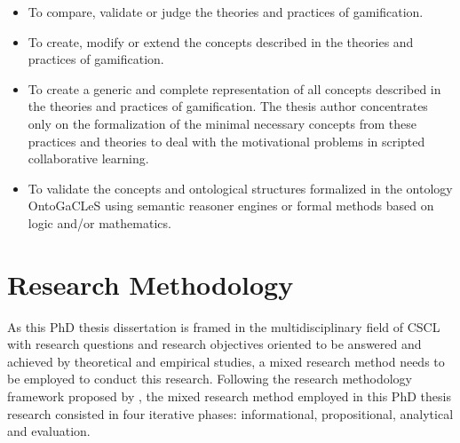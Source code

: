 \begin{itemize}
\item
To compare, validate or judge the theories and practices of gamification.

\item
To create, modify or extend the concepts described in the theories and practices of gamification.

\item
To create a generic and complete representation of all concepts described in the theories and practices of gamification. The thesis author concentrates only on the formalization of the minimal necessary concepts from these practices and theories to deal with the motivational problems in scripted collaborative learning.

\item
To validate the concepts and ontological structures formalized in the ontology OntoGaCLeS using semantic reasoner engines or formal methods based on logic and/or mathematics.
\end{itemize}

\section{Research Methodology}
\label{sec:research-methodology}

As this PhD thesis dissertation is framed in the multidisciplinary field of CSCL with research questions and research objectives oriented to be answered and achieved by theoretical and empirical studies, a mixed research method needs to be employed to conduct this research.
Following the research methodology framework proposed by , the mixed research method employed in this PhD thesis research consisted in four iterative phases: informational, propositional, analytical and evaluation.

